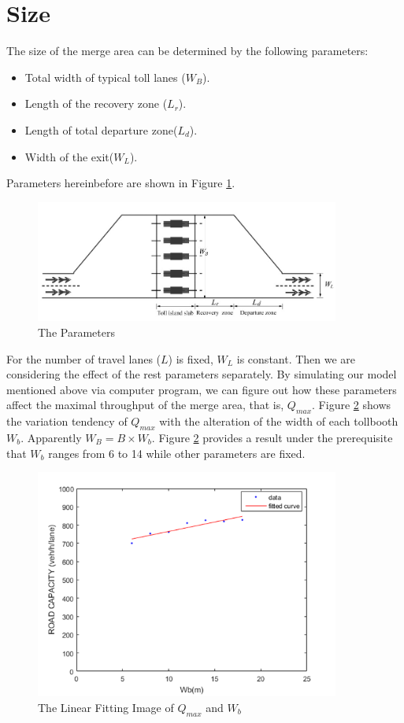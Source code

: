 \documentclass{mcmthesis}
\begin{document}
\section{Size}

The size of the merge area can be determined by
the following parameters:
\begin{itemize}
\item Total width of typical toll lanes ($W_{B}$).
\item Length of the recovery zone ($L_{r}$).
\item Length of total departure zone($L_{d}$).
\item Width of the exit($W_{L}$).
\end{itemize}
Parameters hereinbefore are shown in Figure \ref{fig4}.
\begin{figure}[h]
\small
\centering
\includegraphics[width=10cm]{figure4}
\caption{The Parameters}\label{fig4}
\end{figure}
For the number of travel lanes ($L$) is fixed, $W_{L}$ is
constant. Then we are considering the effect of the
rest parameters separately. By simulating our model
mentioned above via computer program, we can figure
out how these parameters affect the maximal throughput
of the merge area, that is, $Q_{max}$.
Figure \ref{fig5} shows the variation tendency of
$Q_{max}$ with
the alteration of the width of each tollbooth $W_{b}$.
Apparently $W_{B} = B \times W_{b}$. Figure \ref{fig5}
provides a result
under the prerequisite that $W_b$ ranges from 6 to 14
while other parameters are fixed.
\begin{figure}[h]
\small
\centering
\includegraphics[width=10cm]{figure5}
\caption{The Linear Fitting Image of $Q_{max}$ and $W_b$}\label{fig5}
\end{figure}
\end{document}
